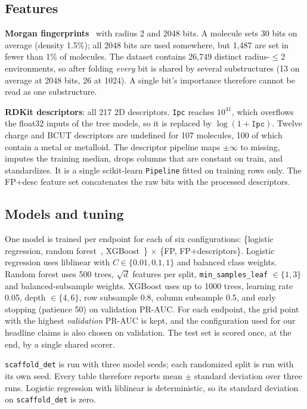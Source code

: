 \documentclass[conference]{IEEEtran}
\begin{document}
\subsection{Features}
\textbf{Morgan fingerprints}~\cite{rogers2010ecfp} with radius 2 and 2048 bits. A molecule sets 30 bits on average (density 1.5\%); all 2048 bits are used somewhere, but 1{,}487 are set in fewer than 1\% of molecules. The dataset contains 26{,}749 distinct radius-$\le$2 environments, so after folding \emph{every} bit is shared by several substructures (13 on average at 2048 bits, 26 at 1024). A single bit's importance therefore cannot be read as one substructure.

\textbf{RDKit descriptors}: all 217 2D descriptors. \texttt{Ipc} reaches $10^{41}$, which overflows the float32 inputs of the tree models, so it is replaced by $\log(1+\texttt{Ipc})$. Twelve charge and BCUT descriptors are undefined for 107 molecules, 100 of which contain a metal or metalloid. The descriptor pipeline maps $\pm\infty$ to missing, imputes the training median, drops columns that are constant on train, and standardizes. It is a single scikit-learn \texttt{Pipeline} fitted on training rows only. The FP+desc feature set concatenates the raw bits with the processed descriptors.

\subsection{Models and tuning}
One model is trained per endpoint for each of six configurations: \{logistic regression, random forest~\cite{breiman2001rf}, XGBoost~\cite{chen2016xgboost}\} $\times$ \{FP, FP+descriptors\}. Logistic regression uses liblinear with $C \in \{0.01, 0.1, 1\}$ and balanced class weights. Random forest uses 500 trees, $\sqrt{d}$ features per split, \texttt{min\_samples\_leaf} $\in \{1, 3\}$ and balanced-subsample weights. XGBoost uses up to 1000 trees, learning rate 0.05, depth $\in \{4, 6\}$, row subsample 0.8, column subsample 0.5, and early stopping (patience 50) on validation PR-AUC. For each endpoint, the grid point with the highest \emph{validation} PR-AUC is kept, and the configuration used for our headline claims is also chosen on validation. The test set is scored once, at the end, by a single shared scorer.

\texttt{scaffold\_det} is run with three model seeds; each randomized split is run with its own seed. Every table therefore reports mean $\pm$ standard deviation over three runs. Logistic regression with liblinear is deterministic, so its standard deviation on \texttt{scaffold\_det} is zero.
\end{document}
